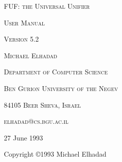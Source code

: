 \documentclass[10pt,a4paper]{report}
\begin{document}

\begin{titlepage}
	\begin{center}
	{\scshape\LARGE FUF: the Universal Unifier\par}
	{\scshape\Large User Manual\par}
	{\scshape\Large Version 5.2\par}
	\vspace{1cm}
	{\scshape Michael Elhadad\par}
	{\scshape Department of Computer Science\par}
	{\scshape Ben Gurion University of the Negev\par}
	{\scshape 84105 Beer Sheva, Israel\par}
	{\scshape elhadad@cs.bgu.ac.il\par}
	\vspace{1.5cm}
	\vfill
	{\large 27 June 1993\par}
	{Copyright \copyright 1993 Michael Elhadad}
	\end{center}

\begin{abstract} 
This document is the user manual for FUF version 5.2, a natural language
generator program that uses the technique of unification grammars. The
program is composed of two main modules: a unifier and a linearizer. The
unifier takes as input a semantic description of the text to be generated
and a unification grammar, and produces as output a rich syntactic
description of the text. The linearizer interprets this syntactic
description and produces an English sentence. This manual includes a
detailed presentation of the technique of unification grammars and a
reference manual for the current implementation (FUF 5.2).
Version 5.2 includes novel techniques in the unification allowing the
specification of types and the expression of complete information.  It also
allows for procedural unification and supports sophisticated forms of control.
\end{abstract}


\end{titlepage}
\end{document}
